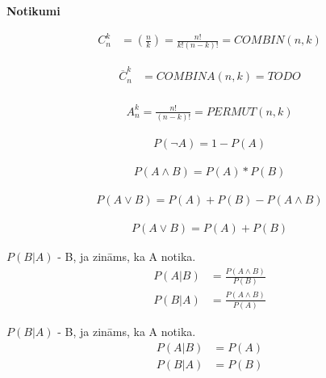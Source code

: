 \linebreak
\textbf{Notikumi}

{\begin{align*}
    C_n^k &= (\frac{n}{k}) = \frac{n!}{k!(n-k)!} = COMBIN(n, k)
\end{align*}}

{\begin{align*}
    \overline{C}_n^k &= COMBINA(n, k) = TODO \\
\end{align*}}

{\begin{align*}
    A_n^k = \frac{n!}{(n-k)!} = PERMUT(n, k)
\end{align*}}

{\begin{align*}
    P(\lnot A ) = 1 - P (A)
\end{align*}}

{\begin{align*}
    P(A \land B) = P(A) * P(B)
\end{align*}}

{\begin{align*}
    P(A \lor B) = P(A) + P(B) - P(A \land B)
\end{align*}}

{\begin{align*}
    P(A \lor B) = P(A) + P(B)
\end{align*}}


{

    $P(B|A)$ - B, ja zināms, ka A notika.
    \begin{align*}
        P(A|B) &= \displaystyle\frac{P(A \land B)}{P(B)} \\
        P(B|A) &= \displaystyle\frac{P(A \land B)}{P(A)}
    \end{align*}
}



{

    $P(B|A)$ - B, ja zināms, ka A notika.
    \begin{align*}
        P(A|B) &= P(A) \\ 
        P(B|A) &= P(B) 
    \end{align*}
}


